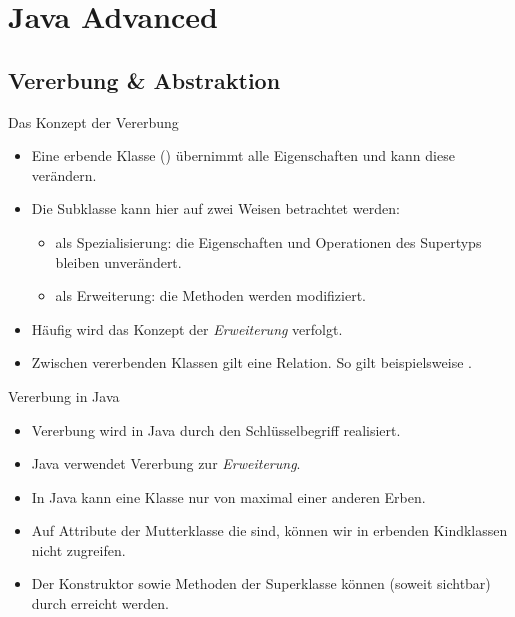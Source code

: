 
\section{Java Advanced}

\subsection{Vererbung \& Abstraktion}

\begin{frame}{Das Konzept der Vererbung}
    \hypertarget<1>{mrk:Vererbung}{}%
    \begin{itemize}[<+(1)->]
        \widei
        \item Eine erbende Klasse () übernimmt alle Eigenschaften und kann diese verändern.
        \item Die Subklasse kann hier auf zwei Weisen betrachtet werden: \begin{itemize}
            \item als Spezialisierung: die Eigenschaften und Operationen des Supertyps bleiben unverändert.
            \item als Erweiterung: die Methoden werden modifiziert.
        \end{itemize}
        \item Häufig wird das Konzept der \emph{Erweiterung} verfolgt.
        \item Zwischen vererbenden Klassen gilt eine  Relation.\pause{} So gilt beispielsweise .
    \end{itemize}
\end{frame}

\begin{frame}{Vererbung in Java}
    \begin{itemize}[<+(1)->]
        \widei
        \item Vererbung wird in Java durch den Schlüsselbegriff  realisiert.
        \item Java verwendet Vererbung zur \emph{Erweiterung}.
        \item In Java kann eine Klasse nur von maximal einer anderen Erben.
        \item Auf Attribute der Mutterklasse die  sind, können wir in erbenden Kindklassen nicht zugreifen.
        \item Der Konstruktor sowie Methoden der Superklasse können (soweit sichtbar) durch  erreicht werden.
    \end{itemize}
\end{frame}

